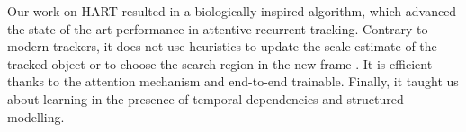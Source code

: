     
    Our work on HART resulted in a biologically-inspired algorithm, which advanced the state-of-the-art performance in attentive recurrent tracking. Contrary to modern trackers, it does not use heuristics to update the scale estimate of the tracked object or to choose the search region in the new frame \citep{Bertinetto2016,Held2016}. It is efficient thanks to the attention mechanism and end-to-end trainable. Finally, it taught us about learning in the presence of temporal dependencies and structured modelling. 
    
%   